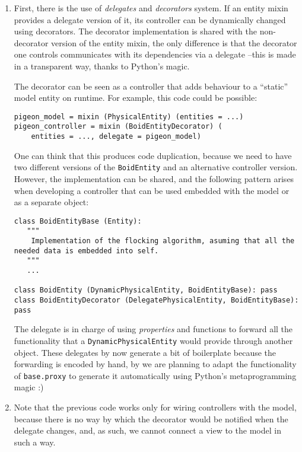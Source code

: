 \documentclass[a4paper,10pt]{article}
\begin{document}
\begin{enumerate}
\item First, there is the use of \emph{delegates} and \emph{decorators}
  system. If an entity mixin provides a delegate version of it, its
  controller can be dynamically changed using decorators. The
  decorator implementation is shared with the non-decorator version of
  the entity mixin, the only difference is that the decorator one
  controls communicates with its dependencies via a delegate --this is
  made in a transparent way, thanks to Python's magic. 

  The decorator can be seen as a controller that adds behaviour to a
  ``static'' model entity on runtime. For example, this code could be
  possible:

{\footnotesize
\begin{verbatim}
pigeon_model = mixin (PhysicalEntity) (entities = ...)
pigeon_controller = mixin (BoidEntityDecorator) (
    entities = ..., delegate = pigeon_model)
\end{verbatim}
}

One can think that this produces code duplication, because we need to
have two different versions of the \texttt{BoidEntity} and an
alternative controller version. However, the implementation can be
shared, and the following pattern arises when developing a controller
that can be used embedded with the model or as a separate object:

{\footnotesize
\begin{verbatim}
class BoidEntityBase (Entity):
   """
    Implementation of the flocking algorithm, asuming that all the
needed data is embedded into self.
   """
   ...

class BoidEntity (DynamicPhysicalEntity, BoidEntityBase): pass
class BoidEntityDecorator (DelegatePhysicalEntity, BoidEntityBase): pass
\end{verbatim}
}

The delegate is in charge of using \emph{properties} and functions to
forward all the functionality that a \texttt{DynamicPhysicalEntity}
would provide through another object. These delegates by now generate
a bit of boilerplate because the forwarding is encoded by hand, by we
are planning to adapt the functionality of \texttt{base.proxy} to
generate it automatically using Python's metaprogramming magic :)

\item Note that the previous code works only for wiring controllers
  with the model, because there is no way by which the decorator would
  be notified when the delegate changes, and, as such, we cannot
  connect a view to the model in such a way.


\end{enumerate}
\end{document}
